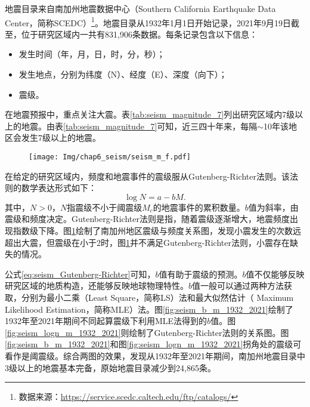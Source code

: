 地震目录来自南加州地震数据中心（Southern California Earthquake Data Center，简称SCEDC）\footnote{数据来源：\href{https://service.scedc.caltech.edu/ftp/catalogs/}{https://service.scedc.caltech.edu/ftp/catalogs/}}。地震目录从1932年1月1日开始记录，2021年9月19日截至，位于研究区域内一共有831,906条数据。每条记录包含以下信息：
\begin{itemize}
  \item[1] 发生时间（年，月，日，时，分，秒）；
  \item[2] 发生地点，分别为纬度（N）、经度（E）、深度（向下）；
  \item[3] 震级。
\end{itemize}

在地震预报中，重点关注大震。表\ref{tab:seism_magnitude_7}列出研究区域内7级以上的地震。由表\ref{tab:seism_magnitude_7}可知，近三四十年来，每隔$\sim$10年该地区会发生7级以上的地震。

\begin{figure}[!htbp]
  \centering
  \texttt{[image: Img/chap6\_seism/seism\_m\_f.pdf]}
  \vspace{-0.5cm}
  \label{fig:seism_m_f}
\end{figure}

在给定的研究区域内，频度和地震事件的震级服从Gutenberg-Richter法则\citep{Gutenberg1994Frequency,Panakkat2007Neural}。该法则的数学表达形式如下：
\begin{equation}
  \label{eq:seism_Gutenberg-Richter}
  \log N=a-bM.
\end{equation}
其中，$N>0$，$N$指震级不小于阈震级$M_c$的地震事件的累积数量。$b$值为斜率，由震级和频度决定。Gutenberg-Richter法则是指，随着震级逐渐增大，地震频度出现指数级下降\citep{Asim2018Earthquake}。图\ref{fig:seism_m_f}绘制了南加州地区震级与频度关系图，发现小震发生的次数远超出大震，但震级在小于2时，图\ref{fig:seism_m_f}并不满足Gutenberg-Richter法则，小震存在缺失的情况。

公式\ref{eq:seism_Gutenberg-Richter}可知，$b$值有助于震级的预测。$b$值不仅能够反映研究区域的地质构造，还能够反映地球物理特性。$b$值一般可以通过两种方法获取，分别为最小二乘（Least Square，简称LS）法和最大似然估计（ Maximum Likelihood Estimation，简称MLE）法。图\ref{fig:seism_b_m_1932_2021}绘制了1932年至2021年期间不同起算震级下利用MLE法得到的$b$值。图\ref{fig:seism_logn_m_1932_2021}则绘制了Gutenberg-Richter法则的关系图。图\ref{fig:seism_b_m_1932_2021}和图\ref{fig:seism_logn_m_1932_2021}拐角处的震级可看作是阈震级。综合两图的效果，发现从1932年至2021年期间，南加州地震目录中3级以上的地震基本完备，原始地震目录减少到24,865条。

